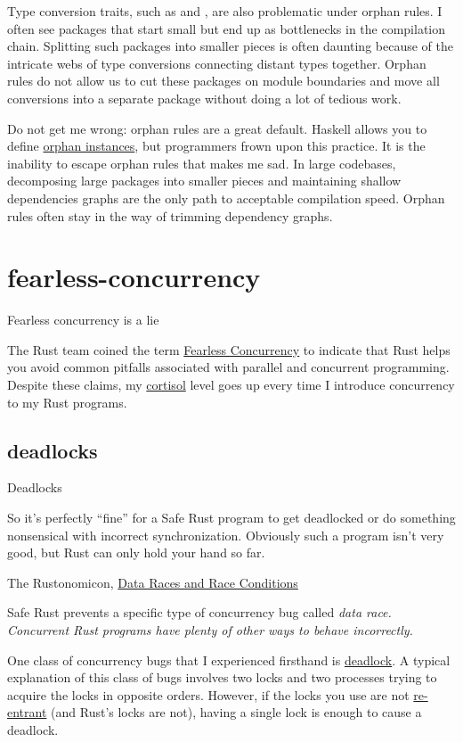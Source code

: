 \documentclass{article}
\begin{document}
Type conversion traits, such as  and , are also problematic under orphan rules.
I often see  packages that start small but end up as bottlenecks in the compilation chain.
Splitting such packages into smaller pieces is often daunting because of the intricate webs of type conversions connecting distant types together.
Orphan rules do not allow us to cut these packages on module boundaries and move all conversions into a separate package without doing a lot of tedious work.

Do not get me wrong: orphan rules are a great default.
Haskell allows you to define \href{https://wiki.haskell.org/Orphan_instance}{orphan instances}, but programmers frown upon this practice.
It is the inability to escape orphan rules that makes me sad.
In large codebases, decomposing large packages into smaller pieces and maintaining shallow dependencies graphs are the only path to acceptable compilation speed.
Orphan rules often stay in the way of trimming dependency graphs.

\section{fearless-concurrency}{Fearless concurrency is a lie}

The Rust team coined the term \href{https://blog.rust-lang.org/2015/04/10/Fearless-Concurrency.html}{Fearless Concurrency} to indicate that Rust helps you avoid common pitfalls associated with parallel and concurrent programming.
Despite these claims, my \href{https://en.wikipedia.org/wiki/Cortisol}{cortisol} level goes up every time I introduce concurrency to my Rust programs.

\subsection{deadlocks}{Deadlocks}
\epigraph{
    So it's perfectly ``fine'' for a Safe Rust program to get deadlocked or do something nonsensical with incorrect synchronization.
    Obviously such a program isn't very good, but Rust can only hold your hand so far.
}{The Rustonomicon, \href{https://doc.rust-lang.org/nomicon/races.html}{Data Races and Race Conditions}}

Safe Rust prevents a specific type of concurrency bug called \em{data race}.
Concurrent Rust programs have plenty of other ways to behave incorrectly.

One class of concurrency bugs that I experienced firsthand is \href{https://en.wikipedia.org/wiki/Deadlock}{deadlock}.
A typical explanation of this class of bugs involves two locks and two processes trying to acquire the locks in opposite orders.
However, if the locks you use are not \href{https://stackoverflow.com/questions/1312259/what-is-the-re-entrant-lock-and-concept-in-general}{re-entrant} (and Rust's locks are not), having a single lock is enough to cause a deadlock.
\end{document}
